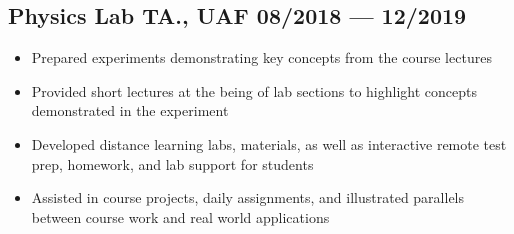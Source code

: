 \documentclass[letterpaper,11pt]{article}
\begin{document}
\subsection*{{\color{cvblue} Physics Lab TA., UAF } \hfill 08/2018 --- 12/2019} 
    \begin{itemize}
    \setlength{\itemsep}{-.5pt}
\item Prepared experiments demonstrating key concepts from the course lectures
\item Provided short lectures at the being of lab sections to highlight concepts demonstrated in the experiment
\item Developed distance learning labs, materials, as well as interactive remote test prep, homework, and lab support for students
 \item Assisted in course projects, daily assignments, and illustrated parallels between course work and real world applications
    \end{itemize}


\end{document}
